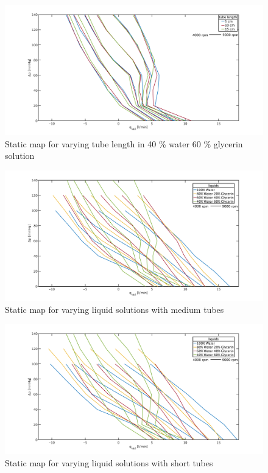 \begin{figure}[ht]
  \includegraphics[width=\textwidth]{images/chapt_4/40w60g_tube_length_new.pdf}
  \caption[Static map for different tube length in 40 \% water 60 \% glycerin solution]{Static map for varying tube length in 40 \% water 60 \% glycerin solution}
    \label{fig:anh_3}
\end{figure}

\begin{figure}[ht]
  \includegraphics[width=\textwidth]{images/chapt_4/medium_liquid_change_new.pdf}
  \caption[Static map for varying liquid solutions with medium tubes]{Static map for varying liquid solutions with medium tubes}
    \label{fig:anh_4}
\end{figure}

\begin{figure}[ht]
  \includegraphics[width=\textwidth]{images/chapt_4/short_liquid_change_new.pdf}
  \caption[Static map for varying liquid solutions with short tubes]{Static map for varying liquid solutions with short tubes}
    \label{fig:anh_5}
\end{figure}
